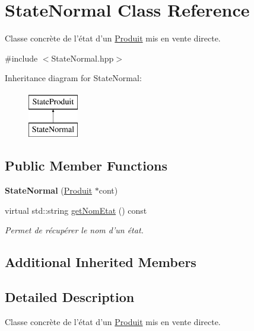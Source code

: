 \hypertarget{classStateNormal}{\section{State\-Normal Class Reference}
\label{classStateNormal}
}


Classe concrète de l'état d'un \hyperlink{classProduit}{Produit} mis en vente directe.  




{\ttfamily \#include $<$State\-Normal.\-hpp$>$}

Inheritance diagram for State\-Normal\-:\begin{figure}[H]
\begin{center}
\leavevmode
\includegraphics[height=2.000000cm]{classStateNormal}
\end{center}
\end{figure}
\subsection*{Public Member Functions}
\begin{DoxyCompactItemize}
\item 
\hypertarget{classStateNormal_a3002ec27b5e26a0bf106c02012fe3436}{{\bfseries State\-Normal} (\hyperlink{classProduit}{Produit} $\ast$cont)}\label{classStateNormal_a3002ec27b5e26a0bf106c02012fe3436}

\item 
virtual std\-::string \hyperlink{classStateNormal_a6e8a998e6c13aafdc49c11eb0907e1ec}{get\-Nom\-Etat} () const 
\begin{DoxyCompactList}\small\item\em Permet de récupérer le nom d'un état. \end{DoxyCompactList}\end{DoxyCompactItemize}
\subsection*{Additional Inherited Members}


\subsection{Detailed Description}
Classe concrète de l'état d'un \hyperlink{classProduit}{Produit} mis en vente directe. 

